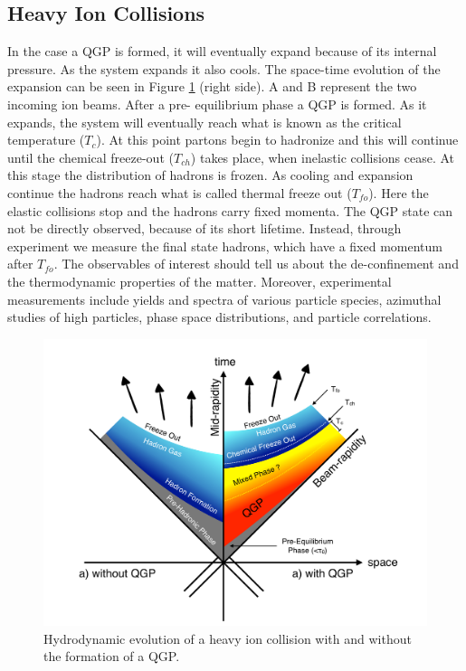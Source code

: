 \subsection{Heavy Ion Collisions}
In the case a QGP is formed, it will eventually expand because of its internal pressure. As the system expands it also cools. The space-time evolution of the expansion can be seen in Figure \ref{fig:freezeout} (right side). A and B represent the two incoming ion beams. After a pre- equilibrium phase a QGP is formed. As it expands, the system will eventually reach what is known as the critical temperature ($T_{c}$). At this point partons begin to hadronize and this will continue until the chemical freeze-out ($T_{ch}$) takes place, when inelastic collisions cease. At this stage the distribution of hadrons is frozen. As cooling and expansion continue the hadrons reach what is called thermal freeze out ($T_{fo}$). Here the elastic collisions stop and the hadrons carry fixed momenta. The QGP state can not be directly observed, because of its short lifetime. Instead, through experiment we measure the final state hadrons, which have a fixed momentum after $T_{fo}$. The observables of interest should tell us about the de-confinement and the thermodynamic properties of the matter. Moreover, experimental measurements include yields and \pt spectra of various particle species, azimuthal studies of high \pt particles, phase space distributions, and particle correlations.

\begin{figure}[htbp]
\begin{center}
\includegraphics[width=10.cm]{./Version1/FigChapter1/FreezeOut}
\caption{Hydrodynamic evolution of a heavy ion collision with and without the formation of a QGP. }
\label{fig:freezeout}
\end{center}
\end{figure}

\newpage